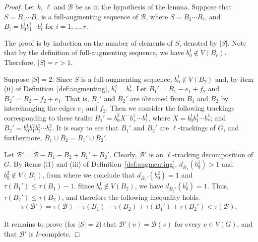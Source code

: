 \documentclass[12pt,reqno,a4paper]{amsart}
\newcommand{\B}{\mathcal{B}}
\newcommand{\full}{full}
\begin{document}
\begin{proof}
Let \(k\), \(\ell\) and \(\B\) be as in the hypothesis of the lemma.
	 Suppose that \(S=B_1\cdots B_r\) is a \full-augmenting sequence  of
\(\B\), where \(S=B_1\cdots B_r\), and 
	\(B_i=b_0^ib_1^i\cdots b_\ell^i\) for $i=1,\ldots,r$.

	The proof is by induction on the number of elements of \(S\), denoted by $|S|$. 
	Note that by the definition of full-augmenting sequence, we have \(b^1_0\notin V(B_r)\).
	Therefore, \(|S| = r>1\).
	
	Suppose \(|S|= 2\).
        Since $S$ is a \full-augmenting sequence,
        \(b_0^1 \notin V(B_2)\)
        and, by item (ii) of Definition~\ref{def:augmenting},
        $b^2_1 = b^1_{*}$.  Let \(\bar B_1' = \bar B_1 - e_1 + f_2\)
        and \(\bar B_2' = \bar B_2 - f_2 + e_1\).
        That is, $\bar B_1'$ and $\bar B_2'$ are obtained from $\bar B_1$ and
        $\bar B_2$ by interchanging the edges $e_1$ and $f_2$. 
        Then we consider the following trackings corresponding to
        these trails: $B_1'= b_0^2X^-b_{+}^1 \cdots b_{\ell}^1$, where $X=b_0^1b_1^1 \cdots
        b_*^1$;  and $B_2'= b_0^1b_1^2b_2^2\cdots b_{\ell}^2$.
        It is easy to see that  $B_1'$ and $B_2'$ are $\ell$-trackings of $G$,  and
        furthermore, $\bar B_1\cup \bar B_2 = \bar B_1' \cup \bar
        B_2'$. 

        Let  \(\B' = \B - B_1 - B_2 + B_1' + B_2'\). Clearly, \(\B'\) is
        an $\ell$-tracking decomposition of $G$. 
	By items (i1) and (iii) of Definition~\ref{def:augmenting},
        \(d_{\bar B_1}(b_0^1) > 1\)
        and \(b_0^2 \notin V(B_1)\),
        from where we conclude that \(d_{\bar B_1'}(b_0^2) = 1\)
        and \(\tau(B_1') \leq \tau(B_1)-1\).
        Since \(b_0^1 \notin V(B_2)\),
        we have \(d_{\bar B_2'}(b_0^1) = 1\). Thus, 
        \(\tau(B_2') \leq \tau(B_2)\), and therefore 
        the following inequality holds. 
	\begin{align*}
		\tau(\B') = \tau(\B) - \tau(B_1) - \tau(B_2) + \tau(B_1') + \tau(B_2')
			  < \tau(\B).
	\end{align*}
	
	It remains to prove (for $|S|=2$) that \(\B'(v) = \B(v)\)
        for every  \(v\in V(G)\), and that $\B'$ is $k$-complete.


\end{proof}
\end{document}
